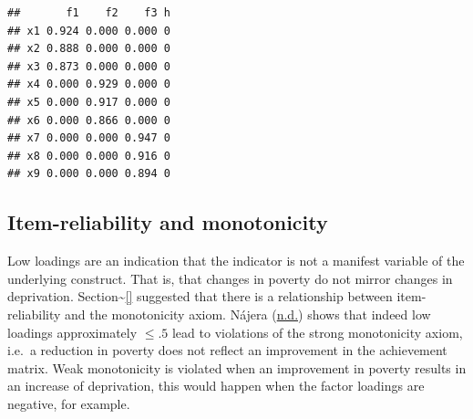 \documentclass[]{book}
\newenvironment{Shaded}{\begin{snugshade}}{\end{snugshade}}
\newcommand{\DataTypeTok}[1]{\textcolor[rgb]{0.13,0.29,0.53}{#1}}
\newcommand{\DecValTok}[1]{\textcolor[rgb]{0.00,0.00,0.81}{#1}}
\newcommand{\KeywordTok}[1]{\textcolor[rgb]{0.13,0.29,0.53}{\textbf{#1}}}
\newcommand{\NormalTok}[1]{#1}
\newcommand{\OperatorTok}[1]{\textcolor[rgb]{0.81,0.36,0.00}{\textbf{#1}}}
\newcommand{\StringTok}[1]{\textcolor[rgb]{0.31,0.60,0.02}{#1}}
\begin{document}
\begin{Shaded}
\end{Shaded}

\begin{verbatim}
##       f1    f2    f3 h
## x1 0.924 0.000 0.000 0
## x2 0.888 0.000 0.000 0
## x3 0.873 0.000 0.000 0
## x4 0.000 0.929 0.000 0
## x5 0.000 0.917 0.000 0
## x6 0.000 0.866 0.000 0
## x7 0.000 0.000 0.947 0
## x8 0.000 0.000 0.916 0
## x9 0.000 0.000 0.894 0
\end{verbatim}

\hypertarget{item-reliability-and-monotonicity}{%
\subsection{Item-reliability and monotonicity}\label{item-reliability-and-monotonicity}}

Low loadings are an indication that the indicator is not a manifest variable of the underlying construct. That is, that changes in poverty do not mirror changes in deprivation. Section\textasciitilde{}\ref{} suggested that there is a relationship between item-reliability and the monotonicity axiom. Nájera (\protect\hyperlink{ref-NajeraForthcoming}{n.d.}) shows that indeed low loadings approximately \(\leq.5\) lead to violations of the strong monotonicity axiom, i.e.~a reduction in poverty does not reflect an improvement in the achievement matrix. Weak monotonicity is violated when an improvement in poverty results in an increase of deprivation, this would happen when the factor loadings are negative, for example.
\end{document}

